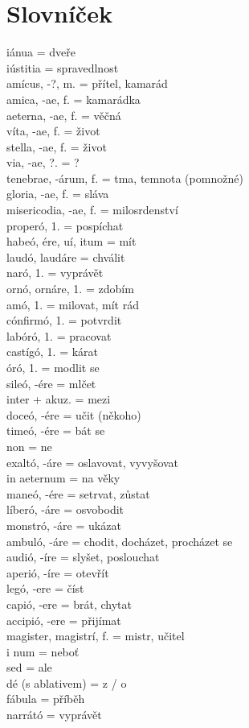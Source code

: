\documentclass[12pt]{article}					%
\begin{document}
\section{Slovníček}
    iánua = dveře\\
    iústitia = spravedlnost\\
    amícus, -?, m. = přítel, kamarád\\
    amica, -ae, f. = kamarádka\\
    aeterna, -ae, f. = věčná\\
    víta, -ae, f. = život\\
    stella, -ae, f. = život\\
    via, -ae, ?. = ?\\
    tenebrae, -árum, f. = tma, temnota (pomnožné)\\
    gloria, -ae, f. = sláva\\
    misericodia, -ae, f. = milosrdenství\\
    properó, 1. = pospíchat\\
    habeó, ére, uí, itum = mít\\
    laudó, laudáre = chválit\\
    naró, 1. = vyprávět\\
    ornó, ornáre, 1. = zdobím\\
    amó, 1. = milovat, mít rád\\
    cónfirmó, 1. = potvrdit\\
    labóró, 1. = pracovat\\
    castígó, 1. = kárat\\
    óró, 1. = modlit se\\
    sileó, -ére = mlčet\\
    inter + akuz. = mezi\\
    doceó, -ére = učit (někoho)\\
    timeó, -ére = bát se\\
    non = ne\\
    exaltó, -áre = oslavovat, vyvyšovat\\
    in aeternum = na věky\\
    maneó, -ére = setrvat, zůstat\\
    líberó, -áre = osvobodit\\
    monstró, -áre = ukázat\\
    ambuló, -áre = chodit, docházet, procházet se\\
    audió, -íre = slyšet, poslouchat\\
    aperió, -íre = otevřít\\
    legó, -ere = číst\\
    capió, -ere = brát, chytat\\
    accipió, -ere = přijímat\\
    magister, magistrí, f. = mistr, učitel\\i
    num = neboť\\
    sed = ale\\
    dé (s ablativem) = z / o\\
    fábula = příběh\\
    narrátó = vyprávět\\
    

    
\end{document}
